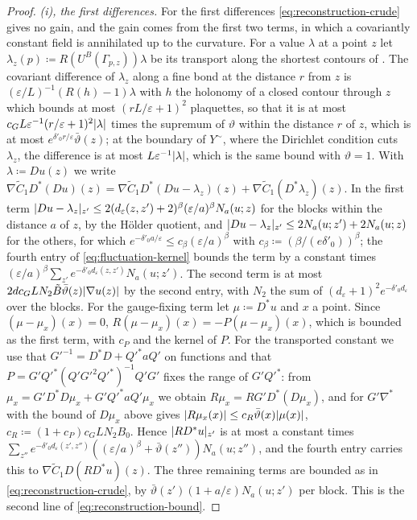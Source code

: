 \documentclass[11pt]{preprint}
\DeclarePairedDelimiter{\abs}{\lvert}{\rvert}
\numberwithin{equation}{section}
\theoremstyle{definition}
\theoremstyle{remark}
\theoremstyle{plain}
\begin{document}
\begin{proof}
\emph{(i), the first differences.} For the first differences \eqref{eq:reconstruction-crude} gives no gain, and the gain comes from the first two terms, in which a covariantly constant field is annihilated up to the curvature. For a value $\lambda$ at a point $z$ let $\lambda_z(p) \coloneqq R(U^B(\Gamma_{p,z}))\lambda$ be its transport along the shortest contours of \cite[(3.40)]{BalabanPBG}. The covariant difference of $\lambda_z$ along a fine bond at the distance $r$ from $z$ is $(\varepsilon/L)^{-1}(R(h) - 1)\lambda$ with $h$ the holonomy of a closed contour through $z$ which bounds at most $(rL/\varepsilon + 1)^2$ plaquettes, so that it is at most $c_GL\varepsilon^{-1}(r/\varepsilon + 1)^2\abs\lambda$ times the supremum of $\vartheta$ within the distance $r$ of $z$, which is at most $e^{\delta'_0r/\varepsilon}\bar\vartheta(z)$; at the boundary of $Y^\sim$, where the Dirichlet condition cuts $\lambda_z$, the difference is at most $L\varepsilon^{-1}\abs\lambda$, which is the same bound with $\vartheta = 1$. With $\lambda \coloneqq Du(z)$ we write $\nabla\tilde C_1D^*(Du)(z) = \nabla\tilde C_1D^*(Du - \lambda_z)(z) + \nabla\tilde C_1(D^*\lambda_z)(z)$. In the first term $\abs{Du - \lambda_z}_{z'} \leq 2(d_\varepsilon(z,z') + 2)^\beta(\varepsilon/a)^\beta N_a(u; z)$ for the blocks within the distance $a$ of $z$, by the H\"older quotient, and $\abs{Du - \lambda_z}_{z'} \leq 2N_a(u; z') + 2N_a(u; z)$ for the others, for which $e^{-\delta'_0a/\varepsilon} \leq c_\beta(\varepsilon/a)^\beta$ with $c_\beta \coloneqq (\beta/(e\delta'_0))^\beta$; the fourth entry of \eqref{eq:fluctuation-kernel} bounds the term by a constant times $(\varepsilon/a)^\beta\sum_{z'}e^{-\delta'_0d_\varepsilon(z,z')}N_a(u; z')$. The second term is at most $2dc_GLN_2\tilde B\bar\vartheta(z)\abs{\nabla u(z)}$ by the second entry, with $N_2$ the sum of $(d_\varepsilon + 1)^2e^{-\delta'_0d_\varepsilon}$ over the blocks. For the gauge-fixing term let $\mu \coloneqq D^*u$ and $x$ a point. Since $(\mu - \mu_x)(x) = 0$, $R(\mu - \mu_x)(x) = -P(\mu - \mu_x)(x)$, which is bounded as the first term, with $c_P$ and the kernel of $P$. For the transported constant we use that $G'^{-1} = D^*D + Q'^*aQ'$ on functions \cite[(3.23), (3.24), p.~394]{BalabanPBG} and that $P = G'Q'^*(Q'G'^2Q'^*)^{-1}Q'G'$ fixes the range of $G'Q'^*$: from $\mu_x = G'D^*D\mu_x + G'Q'^*aQ'\mu_x$ we obtain $R\mu_x = RG'D^*(D\mu_x)$, and \cite[(3.42)]{BalabanPBG} for $G'\nabla^*$ with the bound of $D\mu_x$ above gives $\abs{R\mu_x(x)} \leq c_R\bar\vartheta(x)\abs{\mu(x)}$, $c_R \coloneqq (1 + c_P)c_GLN_2B_0$. Hence $\abs{RD^*u}_{z'}$ is at most a constant times $\sum_{z''}e^{-\delta'_0d_\varepsilon(z',z'')}((\varepsilon/a)^\beta + \bar\vartheta(z''))N_a(u; z'')$, and the fourth entry carries this to $\nabla\tilde C_1D(RD^*u)(z)$. The three remaining terms are bounded as in \eqref{eq:reconstruction-crude}, by $\bar\vartheta(z')(1 + a/\varepsilon)N_a(u; z')$ per block. This is the second line of \eqref{eq:reconstruction-bound}.


\end{proof}
\end{document}
